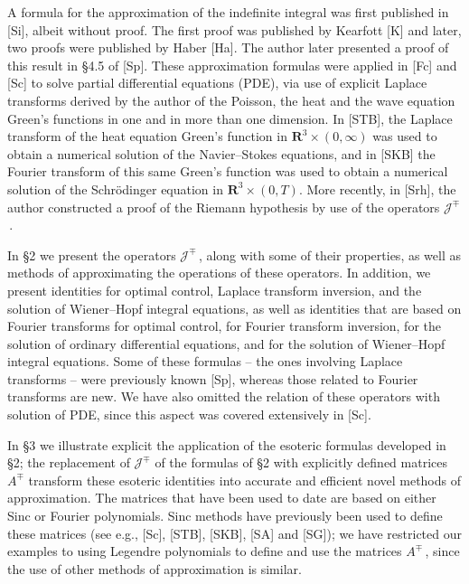 \documentclass[11pt]{article}
\begin{document}
\vspace{.2in} \noindent A formula for the approximation of the
indefinite integral was first published in [Si], albeit without proof.
The first proof was published by Kearfott [K] and later, two proofs
were published by Haber [Ha].  The author later presented a proof of
this result in \S4.5 of [Sp].  These approximation formulas were
applied in [Fc] and [Sc] to solve partial differential equations
(PDE), via use of explicit Laplace transforms derived by the author of
the Poisson, the heat and the wave equation Green's functions in one
and in more than one dimension.  In [STB], the Laplace transform of
the heat equation Green's function in ${\mathbf R}^3 \times
(0,\infty)$ was used to obtain a numerical solution of the
Navier--Stokes equations, and in [SKB] the Fourier transform of this
same Green's function was used to obtain a numerical solution of the
Schr\"odinger equation in ${\mathbf R}^3 \times (0,T)$.  More
recently, in [Srh], the author constructed a proof of the Riemann
hypothesis by use of the operators ${\mathcal J}^\mp$\,.

\vspace{.2in} \noindent In \S2 we present the operators ${\mathcal
  J}^\mp$\,, along with some of their properties, as well as methods
of approximating the operations of these operators.  In addition, we
present identities for optimal control, Laplace transform inversion,
and the solution of Wiener--Hopf integral equations, as well as
identities that are based on Fourier transforms for optimal control,
for Fourier transform inversion, for the solution of ordinary
differential equations, and for the solution of Wiener--Hopf integral
equations.  Some of these formulas -- the ones involving Laplace
transforms -- were previously known [Sp], whereas those related to
Fourier transforms are new.  We have also omitted the relation of
these operators with solution of PDE, since this aspect was covered
extensively in [Sc].

\vspace{.2in} \noindent In \S3 we illustrate explicit the application
of the esoteric formulas developed in \S2; the replacement of
${\mathcal J}^\mp$ of the formulas of \S2 with explicitly defined
matrices $A^\mp$ transform these esoteric identities into accurate and
efficient novel methods of approximation.  The matrices that have been
used to date are based on either Sinc or Fourier polynomials. Sinc
methods have previously been used to define these matrices (see e.g.,
[Sc], [STB], [SKB], [SA] and [SG]); we have restricted our examples to
using Legendre polynomials to define and use the matrices $A^\mp$\,,
since the use of other methods of approximation is similar.
\end{document}
